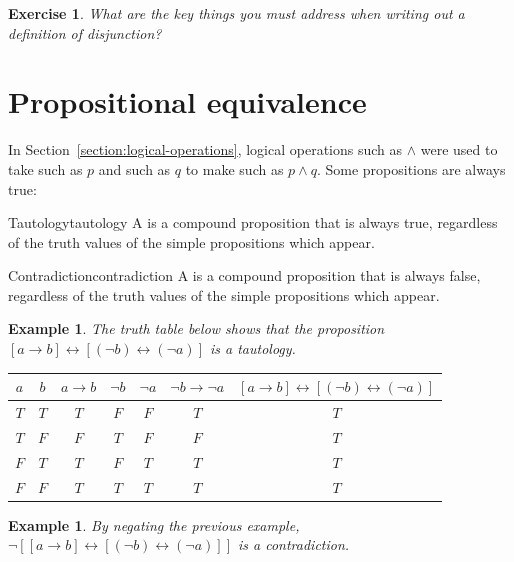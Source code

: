 \documentclass{book}
\newcounter{ekcounter}%
\theoremstyle{ekimcustom}
\newtheorem{example}[ekcounter]{Example}
\newtheorem{exercise}[ekcounter]{Exercise}
\newcommand\defn[1]{{\color{blue}{\bf #1}}}
\begin{document}
\begin{exercise}\label{exercise:disjunction-checklist}
What are the key things you must address when writing out a definition of disjunction?
\end{exercise}

\section{Propositional equivalence}\label{section:propositional-equivalence}

In Section~\ref{section:logical-operations}, logical operations such as $\wedge$ were used to take \defn{simple propositions} such as $p$ and such as $q$ to make \defn{compound propositions} such as $p \wedge q$. Some propositions are always true:
\begin{bdefinition}{Tautology}{tautology}
A \defn{tautology} is a compound proposition that is always true, regardless of the truth values of the simple propositions which appear.
\end{bdefinition}

\begin{bdefinition}{Contradiction}{contradiction}
A \defn{contradiction} is a compound proposition that is always false, regardless of the truth values of the simple propositions which appear.
\end{bdefinition}
\begin{example}
The truth table below shows that the proposition $[a \rightarrow b] \leftrightarrow [(\neg b) \leftrightarrow (\neg a)]$ is a tautology.
\begin{center}
\begin{tabular}{c|c||c|c|c|c|c}
$a$ & $b$ & $a \rightarrow b$ & $\neg b$ & $\neg a$ & $\neg b \rightarrow \neg a$ & $[a \rightarrow b] \leftrightarrow [(\neg b) \leftrightarrow (\neg a)]$ \\\hline
$T$ & $T$ & $T$ & $F$ & $F$ & $T$ & $T$\\
$T$ & $F$ & $F$ & $T$ & $F$ & $F$ & $T$\\
$F$ & $T$ & $T$ & $F$ & $T$ & $T$ & $T$\\
$F$ & $F$ & $T$ & $T$ & $T$ & $T$ & $T$
\end{tabular}
\end{center}
\end{example}
\begin{example}
By negating the previous example, $\neg[[a \rightarrow b] \leftrightarrow [(\neg b) \leftrightarrow (\neg a)]]$ is a contradiction.
\end{example}
\end{document}
